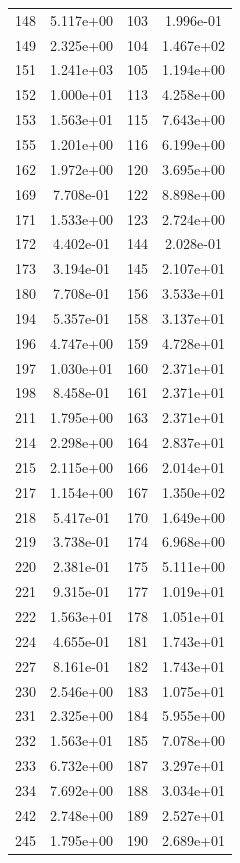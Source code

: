 \documentclass[12pt]{article}
\begin{document}
\begin{longtable}{@{}cccc@{}}
148 & 5.117e+00 & 103 & 1.996e-01 \\
149 & 2.325e+00 & 104 & 1.467e+02 \\
151 & 1.241e+03 & 105 & 1.194e+00 \\
152 & 1.000e+01 & 113 & 4.258e+00 \\
153 & 1.563e+01 & 115 & 7.643e+00 \\
155 & 1.201e+00 & 116 & 6.199e+00 \\
162 & 1.972e+00 & 120 & 3.695e+00 \\
169 & 7.708e-01 & 122 & 8.898e+00 \\
171 & 1.533e+00 & 123 & 2.724e+00 \\
172 & 4.402e-01 & 144 & 2.028e-01 \\
173 & 3.194e-01 & 145 & 2.107e+01 \\
180 & 7.708e-01 & 156 & 3.533e+01 \\
194 & 5.357e-01 & 158 & 3.137e+01 \\
196 & 4.747e+00 & 159 & 4.728e+01 \\
197 & 1.030e+01 & 160 & 2.371e+01 \\
198 & 8.458e-01 & 161 & 2.371e+01 \\
211 & 1.795e+00 & 163 & 2.371e+01 \\
214 & 2.298e+00 & 164 & 2.837e+01 \\
215 & 2.115e+00 & 166 & 2.014e+01 \\
217 & 1.154e+00 & 167 & 1.350e+02 \\
218 & 5.417e-01 & 170 & 1.649e+00 \\
219 & 3.738e-01 & 174 & 6.968e+00 \\
220 & 2.381e-01 & 175 & 5.111e+00 \\
221 & 9.315e-01 & 177 & 1.019e+01 \\
222 & 1.563e+01 & 178 & 1.051e+01 \\
224 & 4.655e-01 & 181 & 1.743e+01 \\
227 & 8.161e-01 & 182 & 1.743e+01 \\
230 & 2.546e+00 & 183 & 1.075e+01 \\
231 & 2.325e+00 & 184 & 5.955e+00 \\
232 & 1.563e+01 & 185 & 7.078e+00 \\
233 & 6.732e+00 & 187 & 3.297e+01 \\
234 & 7.692e+00 & 188 & 3.034e+01 \\
242 & 2.748e+00 & 189 & 2.527e+01 \\
245 & 1.795e+00 & 190 & 2.689e+01 \\

\end{longtable}
\end{document}
